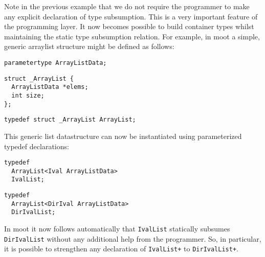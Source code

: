 \documentclass{sigplanconf}
\begin{document}
Note in the previous example that we do not require the programmer to
make any explicit declaration of type subsumption. This is a very
important feature of the programming layer. It now becomes possible to
build container types whilst maintaining the static type subsumption
relation. For example, in {\sc moot} a simple, generic arraylist
structure might be defined as follows:
\begin{samepage}
\begin{verbatim}
parametertype ArrayListData;
\end{verbatim}
\end{samepage}
\begin{samepage}
\begin{verbatim}
struct _ArrayList {
  ArrayListData *elems;
  int size;
};
\end{verbatim}
\end{samepage}
\begin{samepage}
\begin{verbatim}
typedef struct _ArrayList ArrayList;
\end{verbatim}
\end{samepage}
This generic list datastructure can now be instantiated using
parameterized typedef declarations:
\begin{samepage}
\begin{verbatim}
typedef 
  ArrayList<Ival ArrayListData> 
  IvalList;
\end{verbatim}
\end{samepage}
\begin{samepage}
\begin{verbatim}
typedef 
  ArrayList<DirIval ArrayListData> 
  DirIvalList;
\end{verbatim}
\end{samepage}

In {\sc moot} it now follows automatically that \verb+IvalList+
statically subsumes \verb+DirIvalList+ without any additional help
from the programmer. So, in particular, it is possible to strengthen
any declaration of \verb-IvalList+- to \verb-DirIvalList+-.
\end{document}
